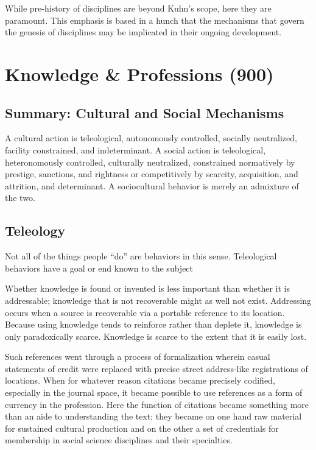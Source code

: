 \documentclass[]{article}
\begin{document}
While pre-history of disciplines are beyond Kuhn's scope, here they are
paramount. This emphasis is based in a hunch that the mechanisms that
govern the genesis of disciplines may be implicated in their ongoing
development.

\section{Knowledge \& Professions
(900)}\label{knowledge-professions-900}

\subsection{Summary: Cultural and Social
Mechanisms}\label{summary-cultural-and-social-mechanisms}

A cultural action is teleological, autonomously controlled, socially
neutralized, facility constrained, and indeterminant. A social action is
teleological, heteronomously controlled, culturally neutralized,
constrained normatively by prestige, sanctions, and rightness or
competitively by scarcity, acquisition, and attrition, and determinant.
A sociocultural behavior is merely an admixture of the two.

\subsection{Teleology}\label{teleology}

Not all of the things people ``do'' are behaviors in this sense.
Teleological behaviors have a goal or end known to the subject

Whether knowledge is found or invented is less important than whether it
is addressable; knowledge that is not recoverable might as well not
exist. Addressing occurs when a source is recoverable via a portable
reference to its location. Because using knowledge tends to reinforce
rather than deplete it, knowledge is only paradoxically scarce.
Knowledge is scarce to the extent that it is easily lost.

Such references went through a process of formalization wherein casual
statements of credit were replaced with precise street address-like
registrations of locations. When for whatever reason citations became
precisely codified, especially in the journal space, it became possible
to use references as a form of currency in the profession. Here the
function of citations became something more than an aide to
understanding the text; they became on one hand raw material for
sustained cultural production and on the other a set of credentials for
membership in social science disciplines and their specialties.
\end{document}
